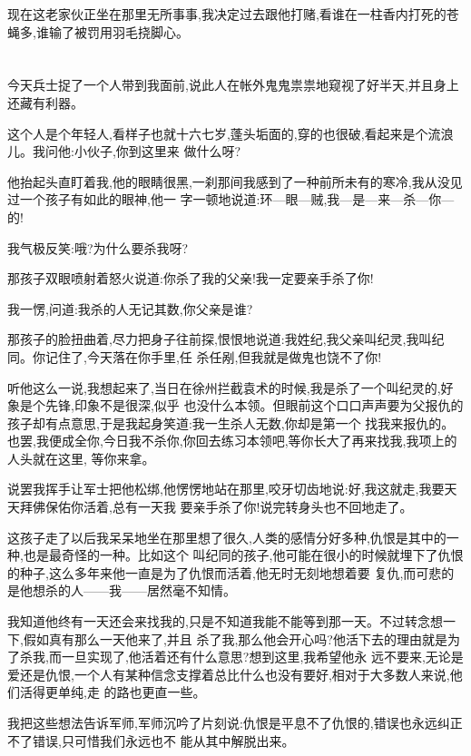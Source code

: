 ﻿\documentclass[12pt,twocolumn]{article}
\begin{document}
现在这老家伙正坐在那里无所事事,我决定过去跟他打赌,看谁在一柱香内打死的苍蝇多,谁输了被罚用羽毛挠脚心。

\section{}

今天兵士捉了一个人带到我面前,说此人在帐外鬼鬼祟祟地窥视了好半天,并且身上还藏有利器。

这个人是个年轻人,看样子也就十六七岁,蓬头垢面的,穿的也很破,看起来是个流浪儿。我问他:小伙子,你到这里来
做什么呀?

他抬起头直盯着我,他的眼睛很黑,一刹那间我感到了一种前所未有的寒冷,我从没见过一个孩子有如此的眼神,他一
字一顿地说道:环—眼—贼,我—是—来—杀—你—的!

我气极反笑:哦?为什么要杀我呀?

那孩子双眼喷射着怒火说道:你杀了我的父亲!我一定要亲手杀了你!

我一愣,问道:我杀的人无记其数,你父亲是谁?

那孩子的脸扭曲着,尽力把身子往前探,恨恨地说道:我姓纪,我父亲叫纪灵,我叫纪同。你记住了,今天落在你手里,任
杀任剐,但我就是做鬼也饶不了你!

听他这么一说,我想起来了,当日在徐州拦截袁术的时候,我是杀了一个叫纪灵的,好象是个先锋,印象不是很深,似乎
也没什么本领。但眼前这个口口声声要为父报仇的孩子却有点意思,于是我起身笑道:我一生杀人无数,你却是第一个
找我来报仇的。也罢,我便成全你,今日我不杀你,你回去练习本领吧,等你长大了再来找我,我项上的人头就在这里,
等你来拿。

说罢我挥手让军士把他松绑,他愣愣地站在那里,咬牙切齿地说:好,我这就走,我要天天拜佛保佑你活着,总有一天我
要亲手杀了你!说完转身头也不回地走了。

这孩子走了以后我呆呆地坐在那里想了很久,人类的感情分好多种,仇恨是其中的一种,也是最奇怪的一种。比如这个
叫纪同的孩子,他可能在很小的时候就埋下了仇恨的种子,这么多年来他一直是为了仇恨而活着,他无时无刻地想着要
复仇,而可悲的是他想杀的人——我——居然毫不知情。

我知道他终有一天还会来找我的,只是不知道我能不能等到那一天。不过转念想一下,假如真有那么一天他来了,并且
杀了我,那么他会开心吗?他活下去的理由就是为了杀我,而一旦实现了,他活着还有什么意思?想到这里,我希望他永
远不要来,无论是爱还是仇恨,一个人有某种信念支撑着总比什么也没有要好,相对于大多数人来说,他们活得更单纯,走
的路也更直一些。

我把这些想法告诉军师,军师沉吟了片刻说:仇恨是平息不了仇恨的,错误也永远纠正不了错误,只可惜我们永远也不
能从其中解脱出来。

\section{}
\end{document}
